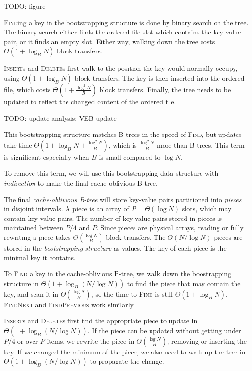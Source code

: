 TODO: figure

\textsc{Find}ing a key in the bootstrapping structure is done by binary search
on the tree. The binary search either finds the ordered file slot which contains
the key-value pair, or it finds an empty slot. Either way, walking down
the tree costs $\Theta(1+\log_B N)$ block transfers.

\textsc{Insert}s and \textsc{Delete}s first walk to the position the key
would normally occupy, using $\Theta(1+\log_B N)$ block transfers. The key
is then inserted into the ordered file, which costs
$\Theta(1+\frac{\log^2 N}{B})$ block transfers. Finally, the tree needs to be
updated to reflect the changed content of the ordered file.

TODO: update analysis: VEB update

This bootstrapping structure matches B-trees in the speed of \textsc{Find},
but updates take time $\Theta(1+\log_B N+\frac{\log^2 N}{B})$, which is
$\frac{\log^2 N}{B}$ more than B-trees.
This term is significant especially when $B$ is small compared to $\log N$.

To remove this term, we will use this bootstrapping data structure with
\textit{indirection} to make the final cache-oblivious B-tree.

The final \textit{cache-oblivious B-tree} will store key-value pairs
partitioned into \textit{pieces} in disjoint intervals. A piece is an array of
$P=\Theta(\log N)$ slots, which may contain key-value pairs.
The number of key-value pairs stored in pieces is maintained between
$P/4$ and $P$. %
Since pieces are physical arrays, reading or fully rewriting a piece
takes $\Theta(\frac{\log N}{B})$ block transfers.
The $\Theta(N/\log N)$ pieces are stored in the \textit{bootstrapping
structure} as values. The key of each piece is the minimal key it contains.

To \textsc{Find} a key in the cache-oblivious B-tree, we walk down the
boostrapping structure in $\Theta(1+\log_B (N/\log N))$ to find the piece
that may contain the key, and scan it in $\Theta(\frac{\log N}{B})$,
so the time to \textsc{Find} is still $\Theta(1+\log_B N)$.
\textsc{FindNext} and \textsc{FindPrevious} work similarly.

\textsc{Insert}s and \textsc{Delete}s first find the appropriate piece
to update in $\Theta(1+\log_B (N/\log N))$. If the piece can be updated
without getting under $P/4$ or over $P$ items, we rewrite the piece in
$\Theta(\frac{\log N}{B})$, removing or inserting the key. If we changed
the minimum of the piece, we also need to walk up the tree in $\Theta(1+\log_B
(N/\log N))$ to propagate the change.

